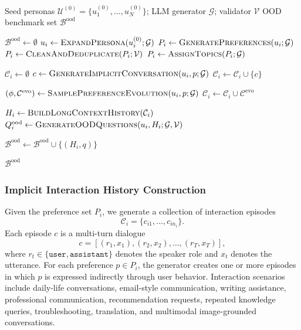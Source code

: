 \documentclass{article}
\begin{document}
\begin{algorithm}[t]
\caption{Construction of PersonaMem-Evo}
\label{alg:persona_mem_evo}
\begin{algorithmic}[1]
\Require Seed personas $\mathcal{U}^{(0)}=\{u_1^{(0)},\ldots,u_N^{(0)}\}$; LLM generator $\mathcal{G}$; validator $\mathcal{V}$
\Ensure OOD benchmark set $\mathcal{B}^{\mathrm{ood}}$

\State $\mathcal{B}^{\mathrm{ood}} \gets \emptyset$
    \State $u_i \gets \textsc{ExpandPersona}(u_i^{(0)};\mathcal{G})$
    \State $P_i \gets \textsc{GeneratePreferences}(u_i;\mathcal{G})$
    \State $P_i \gets \textsc{CleanAndDeduplicate}(P_i;\mathcal{V})$
    \State $P_i \gets \textsc{AssignTopics}(P_i;\mathcal{G})$

    \State $\mathcal{C}_i \gets \emptyset$
        \State $c \gets \textsc{GenerateImplicitConversation}(u_i,p;\mathcal{G})$
        \State $\mathcal{C}_i \gets \mathcal{C}_i \cup \{c\}$

            \State $(\phi,\mathcal{C}^{\mathrm{evo}}) \gets \textsc{SamplePreferenceEvolution}(u_i,p;\mathcal{G})$
            \State $\mathcal{C}_i \gets \mathcal{C}_i \cup \mathcal{C}^{\mathrm{evo}}$
        \EndIf
    \EndFor

    \State $H_i \gets \textsc{BuildLongContextHistory}(\mathcal{C}_i)$
    \State $Q_i^{\mathrm{ood}} \gets \textsc{GenerateOODQuestions}(u_i,H_i;\mathcal{G},\mathcal{V})$

        \State $\mathcal{B}^{\mathrm{ood}} \gets \mathcal{B}^{\mathrm{ood}} \cup \{(H_i,q)\}$
    \EndFor
\EndFor

\State \Return $\mathcal{B}^{\mathrm{ood}}$
\end{algorithmic}
\end{algorithm}

\subsubsection{Implicit Interaction History Construction}
\label{app:persona_implicit_interactions}
Given the preference set $P_i$, we generate a collection of interaction episodes
\[
\mathcal{C}_i = \{c_{i1}, \ldots, c_{in_i}\}.
\]
Each episode $c$ is a multi-turn dialogue
\[
c = \left[(r_1, x_1), (r_2, x_2), \ldots, (r_T, x_T)\right],
\]
where $r_t \in \{\texttt{user}, \texttt{assistant}\}$ denotes the speaker role and $x_t$ denotes the utterance. For each preference $p \in P_i$, the generator creates one or more episodes in which $p$ is expressed indirectly through user behavior. Interaction scenarios include daily-life conversations, email-style communication, writing assistance, professional communication, recommendation requests, repeated knowledge queries, troubleshooting, translation, and multimodal image-grounded conversations.
\end{document}
